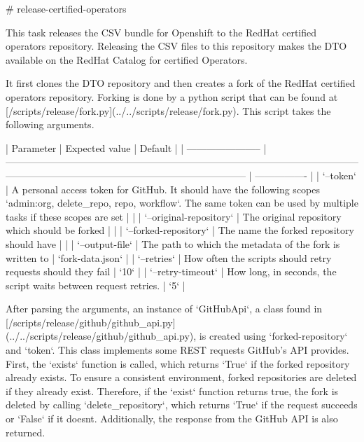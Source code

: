 # release-certified-operators

This task releases the CSV bundle for Openshift to the RedHat certified operators repository.
Releasing the CSV files to this repository makes the DTO available on the RedHat Catalog for certified Operators.

It first clones the DTO repository and then creates a fork of the RedHat certified operators repository.
Forking is done by a python script that can be found at [/scripts/release/fork.py](../../scripts/release/fork.py).
This script takes the following arguments.

| Parameter               | Expected value                                                                                                                                                                         | Default          |
| ----------------------- | -------------------------------------------------------------------------------------------------------------------------------------------------------------------------------------- | ---------------- |
| `--token`               | A personal access token for GitHub. It should have the following scopes `admin:org, delete_repo, repo, workflow`. The same token can be used by multiple tasks if these scopes are set |                  |
| `--original-repository` | The original repository which should be forked                                                                                                                                         |                  |
| `--forked-repository`   | The name the forked repository should have                                                                                                                                             |                  |
| `--output-file`         | The path to which the metadata of the fork is written to                                                                                                                               | `fork-data.json` |
| `--retries`             | How often the scripts should retry requests should they fail                                                                                                                           | `10`             |
| `--retry-timeout`       | How long, in seconds, the script waits between request retries.                                                                                                                        | `5`              |

After parsing the arguments, an instance of `GitHubApi`, a class found in [/scripts/release/github/github_api.py](../../scripts/release/github/github_api.py), is created using `{forked-repository}` and `{token}`.
This class implements some REST requests GitHub's API provides.
First, the `exists` function is called, which returns `True` if the forked repository already exists.
To ensure a consistent environment, forked repositories are deleted if they already exist.
Therefore, if the `exist` function returns true, the fork is deleted by calling `delete_repository`, which returns `True` if the request succeeds or `False` if it doesnt.
Additionally, the response from the GitHub API is also returned.

